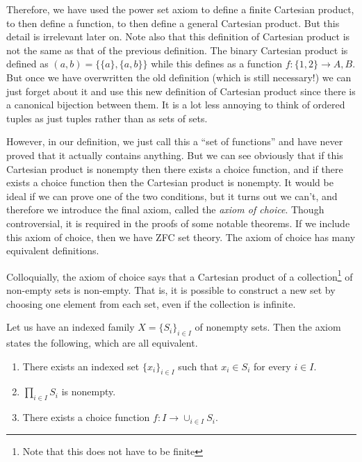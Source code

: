   Therefore, we have used the power set axiom to define a finite Cartesian product, to then define a function, to then define a general Cartesian product. But this detail is irrelevant later on. Note also that this definition of Cartesian product is not the same as that of the previous definition. The binary Cartesian product is defined as $(a, b) = \{\{a\}, \{a, b\}\}$ while this defines as a function $f: \{1, 2\} \rightarrow A, B$. But once we have overwritten the old definition (which is still necessary!) we can just forget about it and use this new definition of Cartesian product since there is a canonical bijection between them. It is a lot less annoying to think of ordered tuples as just tuples rather than as sets of sets. 

  However, in our definition, we just call this a ``set of functions'' and have never proved that it actually contains anything. But we can see obviously that if this Cartesian product is nonempty then there exists a choice function, and if there exists a choice function then the Cartesian product is nonempty. It would be ideal if we can prove one of the two conditions, but it turns out we can't, and therefore we introduce the final axiom, called the \textit{axiom of choice}. Though controversial, it is required in the proofs of some notable theorems. If we include this axiom of choice, then we have ZFC set theory. The axiom of choice has many equivalent definitions. 

  Colloquially, the axiom of choice says that a Cartesian product of a collection\footnote{Note that this does not have to be finite} of non-empty sets is non-empty. That is, it is possible to construct a new set by choosing one element from each set, even if the collection is infinite. 

  \begin{axiom}
    Let us have an indexed family $X = \{S_i\}_{i \in I}$ of nonempty sets. Then the axiom states the following, which are all equivalent. 
    \begin{enumerate}
      \item There exists an indexed set $\{x_i\}_{i \in I}$ such that $x_i \in S_i$ for every $i \in I$. 
      \item $\prod_{i \in I} S_i$ is nonempty. 
      \item There exists a choice function $f: I \rightarrow \cup_{i \in I} S_i$. 
    \end{enumerate}
  \end{axiom}


